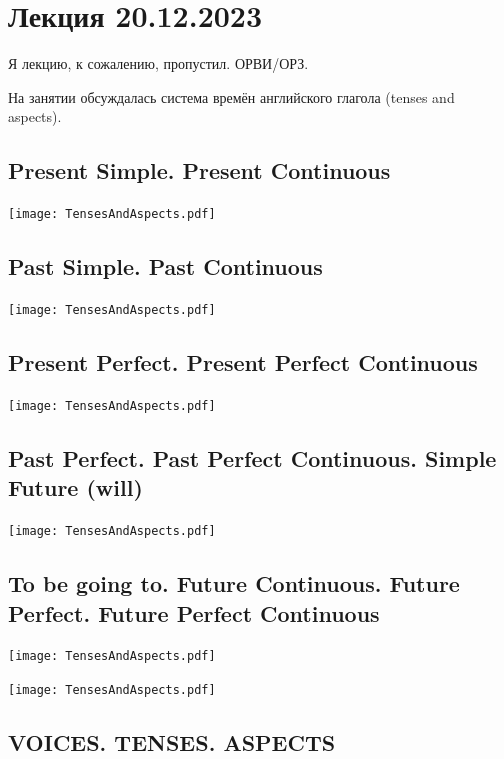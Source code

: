 \documentclass[main.tex]{subfiles}
\begin{document}
\section{Лекция 20.12.2023}

Я лекцию, к сожалению, пропустил. ОРВИ/ОРЗ.

На занятии обсуждалась система времён английского глагола (tenses and aspects).

\subsection{Present Simple. Present Continuous}
\vspace{-10mm}
{\parindent-20pt\texttt{[image: TensesAndAspects.pdf]}}\newpage

\subsection{Past Simple. Past Continuous}
\vspace{-5mm}
{\parindent-20pt\texttt{[image: TensesAndAspects.pdf]}}\newpage

\subsection{Present Perfect. Present Perfect Continuous}
\vspace{-5mm}
{\parindent-20pt\texttt{[image: TensesAndAspects.pdf]}}\newpage

\subsection{Past Perfect. Past Perfect Continuous. Simple Future (will)}
\vspace{-5mm}
{\parindent-20pt\texttt{[image: TensesAndAspects.pdf]}}\newpage

\subsection{To be going to. Future Continuous. Future Perfect. Future Perfect Continuous}
\vspace{-5mm}
{\parindent-20pt\texttt{[image: TensesAndAspects.pdf]}}\newpage

{\parindent-20pt\texttt{[image: TensesAndAspects.pdf]}}

\subsection{VOICES. TENSES. ASPECTS}
\end{document}
